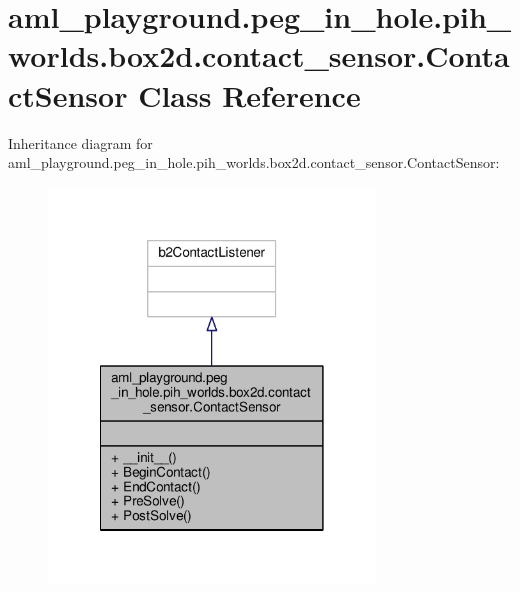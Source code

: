 \hypertarget{classaml__playground_1_1peg__in__hole_1_1pih__worlds_1_1box2d_1_1contact__sensor_1_1_contact_sensor}{\section{aml\-\_\-playground.\-peg\-\_\-in\-\_\-hole.\-pih\-\_\-worlds.\-box2d.\-contact\-\_\-sensor.\-Contact\-Sensor Class Reference}
\label{classaml__playground_1_1peg__in__hole_1_1pih__worlds_1_1box2d_1_1contact__sensor_1_1_contact_sensor}
}


Inheritance diagram for aml\-\_\-playground.\-peg\-\_\-in\-\_\-hole.\-pih\-\_\-worlds.\-box2d.\-contact\-\_\-sensor.\-Contact\-Sensor\-:\nopagebreak
\begin{figure}[H]
\begin{center}
\leavevmode
\includegraphics[width=246pt]{classaml__playground_1_1peg__in__hole_1_1pih__worlds_1_1box2d_1_1contact__sensor_1_1_contact_sensor__inherit__graph}
\end{center}
\end{figure}


